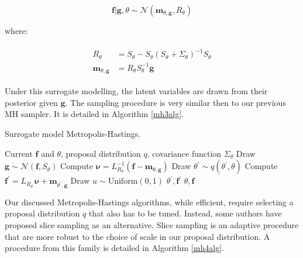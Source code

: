 \documentclass[10pt,a4paper,twoside]{book}
\begin{document}
\begin{equation}
\boldsymbol{f}|\boldsymbol{g}, \theta \sim \mathcal{N}(\boldsymbol{m}_{\theta, \boldsymbol{g}}, R_{\theta})
\end{equation}

where:

\begin{align}
\begin{split}
R_{\theta} &= S_{\theta} - S_{\theta}(S_{\theta} + \Sigma_{\theta})^{-1} S_\theta\\
\boldsymbol{m}_{\theta, \boldsymbol{g}} &= R_\theta S_\theta^{-1}\boldsymbol{g}
\end{split}
\end{align}

Under this surrogate modelling, the latent variables are drawn from their posterior given $\boldsymbol{g}$. The sampling procedure is very similar then to our previous MH sampler. It is detailed in Algorithm \ref{mh3alg}.

\begin{algorithm}
	\caption{Surrogate model Metropolis-Hastings.}
		\label{mh3alg}
		\begin{algorithmic}[1]
		\Require Current $\boldsymbol{f}$ and $\theta$, proposal distribution $q$, covariance function $\Sigma_\theta$ 
		\State Draw $\boldsymbol{g}\sim \mathcal{N}(\boldsymbol{f}, S_\theta)$
		\State Compute $\boldsymbol{\nu} = L_{R_\theta}^{-1}(\boldsymbol{f} - \boldsymbol{m}_{\theta, \boldsymbol{g}})$
		\State Draw $\theta^{'} \sim q(\theta^{'}, \theta)$
		\State Compute $\boldsymbol{f}^{'} = L_{R_{\theta^{'}}}\boldsymbol{\nu}  +  \boldsymbol{m}_{\theta^{'}, \boldsymbol{g}}$
		\State Draw $u\sim \mathrm{Uniform}(0, 1)$
		\Return $\theta^{'}, \boldsymbol{f}^{'}$
		\Else\;
		\Return $\theta, \boldsymbol{f}$
		\EndIf
		\end{algorithmic}
\end{algorithm}

Our discussed Metropolis-Hastings algorithms, while efficient, require selecting a proposal distribution $q$ that also has to be tuned. Instead, some authors \cite{Murray2009, Murray2010} have proposed slice sampling as an alternative. Slice sampling \cite{Neal2003} is an adaptive procedure that are more robust to the choice of scale in our proposal distribution. A procedure from this family is detailed in Algorithm \ref{mh4alg}.
\end{document}
